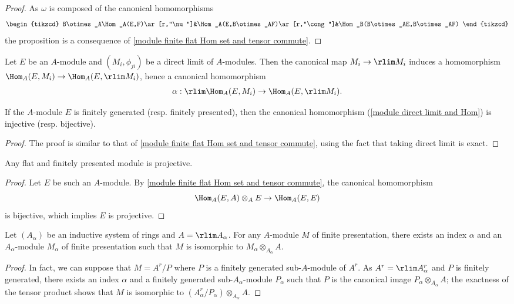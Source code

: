 \begin{proof}
As $\omega$ is composed of the canonical homomorphisms
\[\begin{tikzcd}
B\otimes_A\Hom_A(E,F)\ar[r,"\nu"]&\Hom_A(E,B\otimes_AF)\ar[r,"\cong"]&\Hom_B(B\otimes_AE,B\otimes_AF)
\end{tikzcd}\]
the proposition is a consequence of \cref{module finite flat Hom set and tensor commute}.
\end{proof}
Let $E$ be an $A$-module and $(M_i,\phi_{ji})$ be a direct limit of $A$-modules. Then the canonical map $M_i\to\rlim M_i$ induces a homomorphism $\Hom_A(E,M_i)\to\Hom_A(E,\rlim M_i)$, hence a canonical homomorphism
\begin{align}\label{module direct limit and Hom}
\alpha:\rlim\Hom_A(E,M_i)\to\Hom_A(E,\rlim M_i).
\end{align}
\begin{proposition}\label{module fp Hom and direct limit}
If the $A$-module $E$ is finitely generated (resp. finitely presented), then the canonical homomorphism (\ref{module direct limit and Hom}) is injective (resp. bijective).
\end{proposition}
\begin{proof}
The proof is similar to that of \cref{module finite flat Hom set and tensor commute}, using the fact that taking direct limit is exact.
\end{proof}
\begin{corollary}\label{module flat+fp is proj}
Any flat and finitely presented module is projective.
\end{corollary}
\begin{proof}
Let $E$ be such an $A$-module. By \cref{module finite flat Hom set and tensor commute}, the canonical homomorphism
\[\Hom_A(E,A)\otimes_AE\to\Hom_A(E,E)\]
is bijective, which implies $E$ is projective. 
\end{proof}
\begin{proposition}\label{module fp over limit ring prop}
Let $(A_\alpha)$ be an inductive system of rings and $A=\rlim A_\alpha$. For any $A$-module $M$ of finite presentation, there exists an index $\alpha$ and an $A_\alpha$-module $M_\alpha$ of finite presentation such that $M$ is isomorphic to $M_\alpha\otimes_{A_\alpha}A$.
\end{proposition}
\begin{proof}
In fact, we can suppose that $M=A^r/P$ where $P$ is a finitely generated sub-$A$-module of $A^r$. As $A^r=\rlim A_\alpha^r$ and $P$ is finitely generated, there exists an index $\alpha$ and a finitely generated sub-$A_\alpha$-module $P_\alpha$ such that $P$ is the canonical image $P_\alpha\otimes_{A_\alpha}A$; the exactness of the tensor product shows that $M$ is isomorphic to $(A_\alpha^r/P_\alpha)\otimes_{A_\alpha}A$.
\end{proof}
